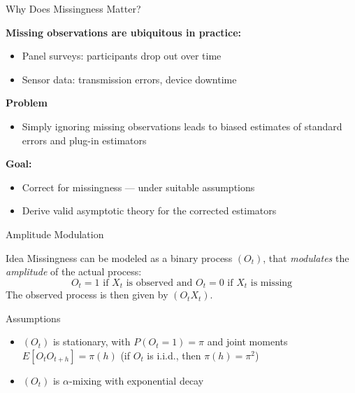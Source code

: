 \documentclass{beamer}
\begin{document}
\begin{frame}{Why Does Missingness Matter?}

\textbf{Missing observations are ubiquitous in practice:}
\begin{itemize}
    \item Panel surveys: participants drop out over time
    \item Sensor data: transmission errors, device downtime
\end{itemize}

\vspace{0.4cm}

\textbf{Problem}

\begin{itemize}
    \item Simply ignoring missing observations leads to biased estimates of standard errors and plug-in estimators
\end{itemize}

\vspace{0.4cm}

\textbf{Goal:}
\begin{itemize}
    \item Correct for missingness — under suitable assumptions
    \item Derive valid asymptotic theory for the corrected estimators
\end{itemize}
\end{frame}

\begin{frame}{Amplitude Modulation}
    \begin{block}{Idea}
        Missingness can be modeled as a binary process $(O_t)$, that \textit{modulates} the \textit{amplitude} of the actual process: 
        \[O_t = 1 \text{ if } X_t \text{ is observed and } O_t = 0 \text{ if } X_t \text{ is missing}\] 
        The observed process is then given by $(O_t X_t)$.
    \end{block}
    \begin{block}{Assumptions}
        \begin{itemize}
            \item $(O_t)$ is stationary, with $P(O_t = 1) = \pi$ 
            and joint moments $E[O_t O_{t+h}] = \pi(h)$ (if $O_t$ is i.i.d., then $\pi(h) = \pi^2$)
            \item $(O_t)$ is $\alpha$-mixing with exponential decay
        \end{itemize}
    \end{block}    
\end{frame}
\end{document}
